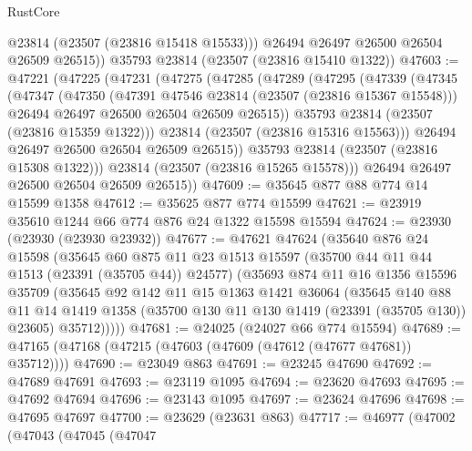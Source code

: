 \begin{lexlean}{RustCore}
\begin{coremodule}
          @23814
          (@23507 (@23816 @15418 @15533)))
        @26494
        @26497
        @26500
        @26504
        @26509
        @26515))
    @35793
    @23814
    (@23507 (@23816 @15410 @1322))
@47603 := @47221
    (@47225
      (@47231
        (@47275
          (@47285
            (@47289
              (@47295
                (@47339
                  (@47345
                    (@47347
                      (@47350
                        (@47391 @47546 @23814 (@23507 (@23816 @15367 @15548)))
                        @26494
                        @26497
                        @26500
                        @26504
                        @26509
                        @26515))
                    @35793
                    @23814
                    (@23507 (@23816 @15359 @1322)))
                  @23814
                  (@23507 (@23816 @15316 @15563)))
                @26494
                @26497
                @26500
                @26504
                @26509
                @26515))
            @35793
            @23814
            (@23507 (@23816 @15308 @1322)))
          @23814
          (@23507 (@23816 @15265 @15578)))
        @26494
        @26497
        @26500
        @26504
        @26509
        @26515))
@47609 := @35645 @877 @88 @774 @14 @15599 @1358
@47612 := @35625 @877 @774 @15599
@47621 := @23919 @35610 @1244 @66 @774 @876 @24 @1322 @15598 @15594
@47624 := @23930 (@23930 (@23930 @23932))
@47677 := @47621
    @47624
    (@35640
      @876
      @24
      @15598
      (@35645
        @60
        @875
        @11
        @23
        @1513
        @15597
        (@35700 @44 @11 @44 @1513 (@23391 (@35705 @44)) @24577)
        (@35693
          @874
          @11
          @16
          @1356
          @15596
          @35709
          (@35645
            @92
            @142
            @11
            @15
            @1363
            @1421
            @36064
            (@35645
              @140
              @88
              @11
              @14
              @1419
              @1358
              (@35700 @130 @11 @130 @1419 (@23391 (@35705 @130)) @23605)
              @35712)))))
@47681 := @24025 (@24027 @66 @774 @15594)
@47689 := @47165 (@47168 (@47215 (@47603 (@47609 (@47612 (@47677 @47681)) @35712))))
@47690 := @23049 @863
@47691 := @23245 @47690
@47692 := @47689 @47691
@47693 := @23119 @1095
@47694 := @23620 @47693
@47695 := @47692 @47694
@47696 := @23143 @1095
@47697 := @23624 @47696
@47698 := @47695 @47697
@47700 := @23629 (@23631 @863)
@47717 := @46977
    (@47002
      (@47043
        (@47045
          (@47047

\end{coremodule}
\end{lexlean}
